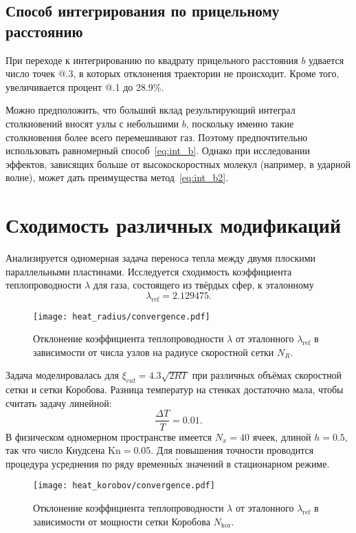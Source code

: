 \documentclass[english,russian,a4paper,12pt]{article}
\makeatletter
\newcommand{\Rmnum}[1]{\expandafter\@slowromancap\romannumeral #1@}
\newcommand{\Kn}{\mathrm{Kn}}
\makeatother
\begin{document}
\subsection{Способ интегрирования по прицельному расстоянию}

При переходе к интегрированию по квадрату прицельного расстояния \(b\)
удвается число точек \Rmnum{1}.3, в которых отклонения траектории не происходит.
Кроме того, увеличивается процент \Rmnum{1}.1 до 28.9\%.

Можно предположить, что больший вклад результирующий интеграл столкновений вносят узлы с небольшими \(b\),
поскольку именно такие столкновения более всего перемешивают газ.
Поэтому предпочтительно использовать равномерный способ~\eqref{eq:int_b}.
Однако при исследовании эффектов, зависящих больше от высокоскоростных молекул (например, в ударной волне),
может дать преимущества метод~\eqref{eq:int_b2}.

\section{Сходимость различных модификаций}

Анализируется одномерная задача переноса тепла между двумя плоскими параллельными пластинами.
Исследуется сходимость коэффициента теплопроводности \(\lambda\) для газа, состоящего из твёрдых сфер, к эталонному
\[ \lambda_\mathrm{ref} = 2.129475. \]

\begin{figure}[ht]
	\centering
	\texttt{[image: heat\_radius/convergence.pdf]}
	\caption{Отклонение коэффициента теплопроводности \(\lambda\) от эталонного \(\lambda_\mathrm{ref}\)
		в зависимости от числа узлов на радиусе скоростной сетки \(N_R\).}
	\label{fig:heat_radius}
\end{figure}

Задача моделировалась для \(\xi_{cut} = 4.3 \sqrt{2RT}\) при различных объёмах скоростной сетки и сетки Коробова.
Разница температур на стенках достаточно мала, чтобы считать задачу линейной:
\[ \frac{\Delta T}{T} = 0.01. \]
В физическом одномерном пространстве имеется \(N_x=40\) ячеек, длиной \(h=0.5\), так что число Кнудсена \(\Kn=0.05\).
Для повышения точности проводится процедура усреднения по ряду временн\'{ы}х значений в стационарном режиме.

\begin{figure}[ht]
	\centering
	\texttt{[image: heat\_korobov/convergence.pdf]}
	\caption{Отклонение коэффициента теплопроводности \(\lambda\) от эталонного \(\lambda_\mathrm{ref}\)
		в зависимости от мощности сетки Коробова \(N_\mathrm{kor}\).}
	\label{fig:heat_korobov}
\end{figure}
\end{document}
